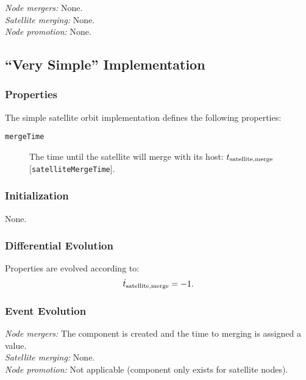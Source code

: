 \noindent\emph{Node mergers:} None.\\

\noindent\emph{Satellite merging:} None.\\

\noindent\emph{Node promotion:} None.\\

\subsection{``Very Simple'' Implementation}

\subsubsection{Properties}

The simple satellite orbit implementation defines the following properties:
\begin{description}
 \item [{\tt mergeTime}] The time until the satellite will merge with its host: $t_{\rm satellite, merge}$ [{\tt satelliteMergeTime}].
\end{description}

\subsubsection{Initialization}

None.

\subsubsection{Differential Evolution}

Properties are evolved according to:
\begin{equation}
 \dot{t}_{\rm satellite, merge} = -1.
\end{equation}

\subsubsection{Event Evolution}

\noindent\emph{Node mergers:} The \gls{component} is created and the time to merging is assigned a value.\\

\noindent\emph{Satellite merging:} None.\\

\noindent\emph{Node promotion:} Not applicable (component only exists for satellite nodes).\\

